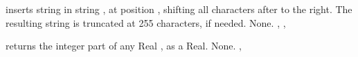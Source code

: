 \documentclass{report}
\begin{document}
\html{}

{ inserts string  in string , at position
, shifting all characters after  to the right. The
resulting string is truncated at 255 characters, if needed.}
{None.}
{, , }

\html{}

{ returns the integer part of any Real , as a Real.}
{None.}
{, }

\html{}
\end{document}
